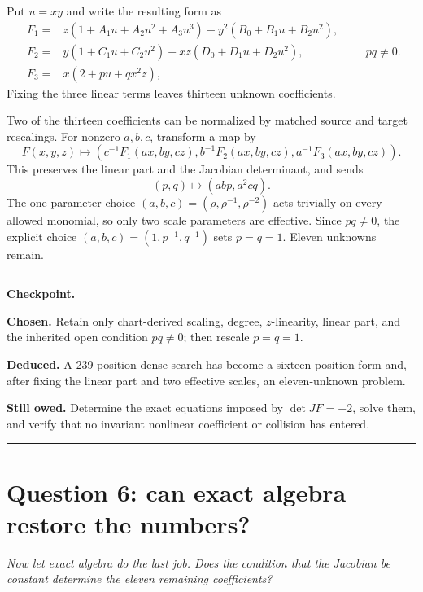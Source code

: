 \documentclass[11pt,a4paper]{article}
\numberwithin{equation}{section}
\theoremstyle{definition}
\theoremstyle{remark}
\newenvironment{userquestion}
  {\par\medskip\noindent{\color{userblue}\bfseries USER}\quad
   \begin{minipage}[t]{0.84\linewidth}\itshape}
  {\end{minipage}\par\medskip}
\newenvironment{modelanswer}
  {\par\smallskip\noindent{\color{modelgreen}\bfseries MODEL}\par\smallskip}
  {\par\medskip}
\newenvironment{checkpoint}
  {\par\smallskip\noindent\color{paperblue}\hrule\color{black}
   \vspace{0.55em}\noindent\begin{minipage}{\linewidth}\small
   \textbf{Checkpoint.}\par\smallskip}
  {\end{minipage}\vspace{0.45em}\color{paperblue}\hrule\color{black}
   \par\medskip}
\newcommand{\chosen}[1]{\textbf{Chosen.} #1\par\smallskip}
\newcommand{\deduced}[1]{\textbf{Deduced.} #1\par\smallskip}
\newcommand{\owed}[1]{\textbf{Still owed.} #1}
\begin{document}
\begin{modelanswer}
Put \(u=xy\) and write the resulting form as
\begin{equation}\label{eq:ansatz}
\begin{aligned}
F_1={}&z(1+A_1u+A_2u^2+A_3u^3)
      +y^2(B_0+B_1u+B_2u^2),\\
F_2={}&y(1+C_1u+C_2u^2)
      +xz(D_0+D_1u+D_2u^2),\\
F_3={}&x(2+pu+qx^2z),
\end{aligned}
\qquad pq\ne0.
\end{equation}
Fixing the three linear terms leaves thirteen unknown coefficients.

Two of the thirteen coefficients can be normalized by matched source and
target rescalings.  For nonzero \(a,b,c\), transform a map by
\begin{equation}\label{eq:matched-rescaling}
F(x,y,z)\longmapsto
\left(c^{-1}F_1(ax,by,cz),
      b^{-1}F_2(ax,by,cz),
      a^{-1}F_3(ax,by,cz)\right).
\end{equation}
This preserves the linear part and the Jacobian determinant, and sends
\[
  (p,q)\longmapsto(abp,a^2cq).
\]
The one-parameter choice
\((a,b,c)=(\rho,\rho^{-1},\rho^{-2})\) acts trivially on every allowed
monomial, so only two scale parameters are effective.  Since \(pq\ne0\), the
explicit choice \((a,b,c)=(1,p^{-1},q^{-1})\) sets \(p=q=1\).  Eleven
unknowns remain.
\end{modelanswer}

\begin{checkpoint}
\chosen{Retain only chart-derived scaling, degree, \(z\)-linearity, linear
part, and the inherited open condition \(pq\ne0\); then rescale \(p=q=1\).}
\deduced{A 239-position dense search has become a sixteen-position form and,
after fixing the linear part and two effective scales, an eleven-unknown
problem.}
\owed{Determine the exact equations imposed by \(\det JF=-2\), solve them,
and verify that no invariant nonlinear coefficient or collision has entered.}
\end{checkpoint}

\section{Question 6: can exact algebra restore the numbers?}

\begin{userquestion}
Now let exact algebra do the last job.  Does the condition that the Jacobian
be constant determine the eleven remaining coefficients?
\end{userquestion}
\end{document}
